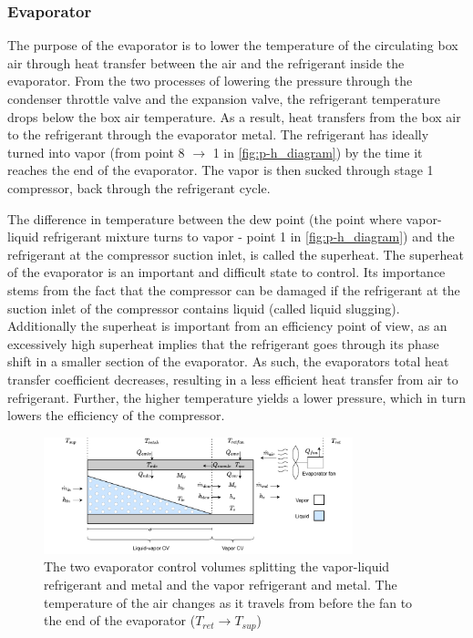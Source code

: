 \newpage
\subsubsection{Evaporator}\label{sec:evaporator}
The purpose of the evaporator is to lower the temperature of the circulating box air through heat transfer between the air and the refrigerant inside the evaporator. From the two processes of lowering the pressure through the condenser throttle valve and the expansion valve, the refrigerant temperature drops below the box air temperature. As a result, heat transfers from the box air to the refrigerant through the evaporator metal. The refrigerant has ideally turned into vapor (from point 8 $\rightarrow$ 1 in \cref{fig:p-h_diagram}) by the time it reaches the end of the evaporator. The vapor is then sucked through stage 1 compressor, back through the refrigerant cycle.

The difference in temperature between the dew point (the point where vapor-liquid refrigerant mixture turns to vapor - point 1 in \cref{fig:p-h_diagram}) and the refrigerant at the compressor suction inlet, is called the superheat. The superheat of the evaporator is an important and difficult state to control. Its importance stems from the fact that the compressor can be damaged if the refrigerant at the suction inlet of the compressor contains liquid (called liquid slugging). Additionally the superheat is important from an efficiency point of view, as an excessively high superheat implies that the refrigerant goes through its phase shift in a smaller section of the evaporator. As such, the evaporators total heat transfer coefficient decreases, resulting in a less efficient heat transfer from air to refrigerant. Further, the higher temperature yields a lower pressure, which in turn lowers the efficiency of the compressor. 

\begin{figure}[h!]
	\centering
	\includegraphics[width=0.8\textwidth]{Graphics/Evaporator_CV_diagram.pdf}
	\caption{The two evaporator control volumes splitting the vapor-liquid refrigerant and metal and the vapor refrigerant and metal. The temperature of the air changes as it travels from before the fan to the end of the evaporator ($T_{ret} \rightarrow T_{sup}$)}
	\label{fig:evap_CV}
\end{figure}

